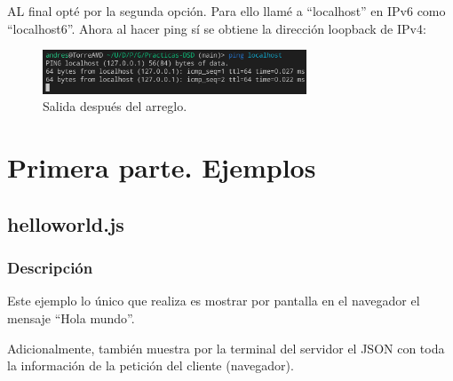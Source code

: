 \documentclass{article}
\begin{document}
AL final opté por la segunda opción. Para ello llamé a ``localhost'' en IPv6 como ``localhost6''. Ahora al hacer ping sí se obtiene la dirección loopback de IPv4:

\begin{figure}[H]
    \centering
    \includegraphics[width=0.7\textwidth]{images/pingOk.png}
    \caption{Salida después del arreglo.}
\end{figure}


\section{Primera parte. Ejemplos}
\subsection{helloworld.js}
\subsubsection{Descripción}
Este ejemplo lo único que realiza es mostrar por pantalla en el navegador el mensaje ``Hola mundo''.

Adicionalmente, también muestra por la terminal del servidor el JSON con toda la información de la petición del cliente (navegador).
\end{document}
